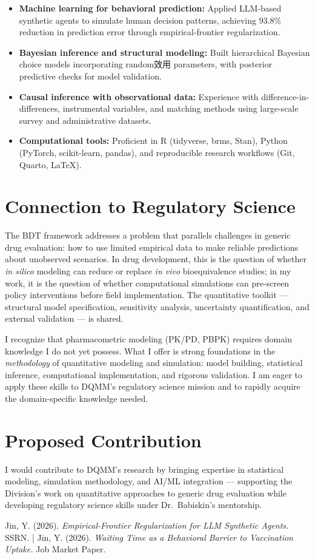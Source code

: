 \documentclass[11pt,a4paper]{article}
\begin{document}
\begin{itemize}[leftmargin=*, nosep]
    \item \textbf{Machine learning for behavioral prediction:} Applied LLM-based synthetic agents to simulate human decision patterns, achieving 93.8\% reduction in prediction error through empirical-frontier regularization.
    \item \textbf{Bayesian inference and structural modeling:} Built hierarchical Bayesian choice models incorporating random效用 parameters, with posterior predictive checks for model validation.
    \item \textbf{Causal inference with observational data:} Experience with difference-in-differences, instrumental variables, and matching methods using large-scale survey and administrative datasets.
    \item \textbf{Computational tools:} Proficient in R (tidyverse, brms, Stan), Python (PyTorch, scikit-learn, pandas), and reproducible research workflows (Git, Quarto, LaTeX).
\end{itemize}

\section*{Connection to Regulatory Science}

The BDT framework addresses a problem that parallels challenges in generic drug evaluation: how to use limited empirical data to make reliable predictions about unobserved scenarios. In drug development, this is the question of whether \textit{in silico} modeling can reduce or replace \textit{in vivo} bioequivalence studies; in my work, it is the question of whether computational simulations can pre-screen policy interventions before field implementation. The quantitative toolkit --- structural model specification, sensitivity analysis, uncertainty quantification, and external validation --- is shared.

I recognize that pharmacometric modeling (PK/PD, PBPK) requires domain knowledge I do not yet possess. What I offer is strong foundations in the \textit{methodology} of quantitative modeling and simulation: model building, statistical inference, computational implementation, and rigorous validation. I am eager to apply these skills to DQMM's regulatory science mission and to rapidly acquire the domain-specific knowledge needed.

\section*{Proposed Contribution}

I would contribute to DQMM's research by bringing expertise in statistical modeling, simulation methodology, and AI/ML integration --- supporting the Division's work on quantitative approaches to generic drug evaluation while developing regulatory science skills under Dr.~Babiskin's mentorship.

\vfill
{} {\small Jin, Y. (2026). \emph{Empirical-Frontier Regularization for LLM Synthetic Agents.} SSRN. \;|\; Jin, Y. (2026). \emph{Waiting Time as a Behavioral Barrier to Vaccination Uptake.} Job Market Paper.}
\end{document}
